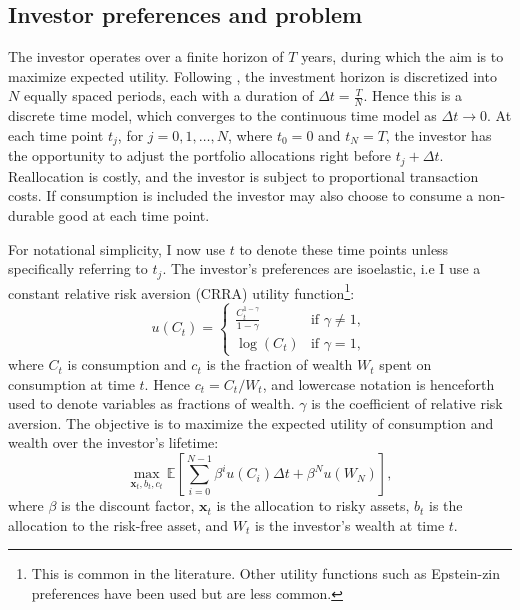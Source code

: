 \documentclass[11pt]{article}
\begin{document}
\subsection{Investor preferences and problem} \label{Subsection: Investor-Preferences}
The investor operates over a finite horizon of \(T\) years, during which the aim is to maximize expected utility. 
Following \textcite{CaiJuddXu2013}, the investment horizon is discretized into \(N\) equally spaced periods, 
each with a duration of \(\Delta t = \frac{T}{N}\). Hence this is a discrete time model, which converges to the continuous time model as \(\Delta t \to 0\).
At each time point \(t_j\), for \(j = 0, 1, \dots, N\), where \(t_0 = 0\) and \(t_N = T\), 
the investor has the opportunity to adjust the portfolio allocations right before \(t_j + \Delta t\). 
Reallocation is costly, and the investor is subject to proportional transaction costs. 
If consumption is included the investor may also choose to consume a non-durable good at each time point.

For notational simplicity, I now use \(t\) to denote these time points unless specifically referring to \(t_j\). 
The investor's preferences are isoelastic, i.e I use a constant relative risk aversion (CRRA) utility function\footnote{This is common in the literature. Other utility functions such as Epstein-zin preferences have been used but are less common.}: 
\begin{equation}\label{eq:CRRA_Utility}
    u(C_t) = \begin{cases}
                \frac{C_t^{1-\gamma}}{1-\gamma} & \text{if } \gamma \neq 1, \\
                \log(C_t) & \text{if } \gamma = 1,
              \end{cases}
\end{equation}
where \(C_t\) is consumption and \(c_t\) is the fraction of wealth $W_t$ spent on consumption at time \(t\). Hence $c_t = C_t / W_t$,
and lowercase notation is henceforth used to denote variables as fractions of wealth. 
\(\gamma\) is the coefficient of relative risk aversion. 
The objective is to maximize the expected utility of consumption and wealth over the investor's lifetime:
\begin{equation}
  \label{eq:Expected_Utility}
  \max_{\mathbf{x}_t, b_t, c_t} \mathbb{E} \left[ \sum^{N-1}_{i=0} \beta^{i} u(C_i) \Delta t + \beta^N u(W_N) \right],
\end{equation}
where \(\beta\) is the discount factor, \(\mathbf{x}_t\) is the allocation to risky assets, \(b_t\) is the allocation to the risk-free asset, and \(W_t\) is the investor's wealth at time \(t\).
\end{document}
